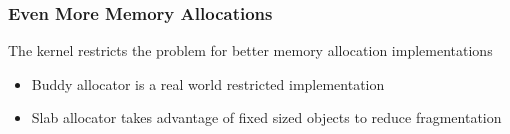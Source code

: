  \begin{frame}
    \frametitle{Even More Memory Allocations}

    The kernel restricts the problem for better memory allocation
    implementations

    \begin{itemize}
      \item Buddy allocator is a real world restricted implementation
      \item Slab allocator takes advantage of fixed sized objects to reduce
            fragmentation
    \end{itemize}
  \end{frame}

